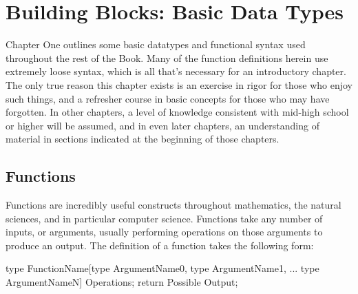 \chapter{Building Blocks: Basic Data Types}

Chapter One outlines some basic datatypes and functional syntax used throughout the rest of the Book. Many of the function definitions herein use extremely loose syntax, which is all that's necessary for an introductory chapter. The only true reason this chapter exists is an exercise in rigor for those who enjoy such things, and a refresher course in basic concepts for those who may have forgotten. In other chapters, a level of knowledge consistent with mid-high school or higher will be assumed, and in even later chapters, an understanding of material in sections indicated at the beginning of those chapters.


\section{Functions}

Functions are incredibly useful constructs throughout mathematics, the natural sciences, and in particular
computer science. Functions take any number of inputs, or arguments, usually performing operations on those arguments to
produce an output. The definition of a function takes the following form:
\begin{center}
type FunctionName[type ArgumentName0, type ArgumentName1, ... type ArgumentNameN]{
	Operations;
	return Possible Output;
}
\begin{verbatim}
\end{verbatim}
\end{center}


